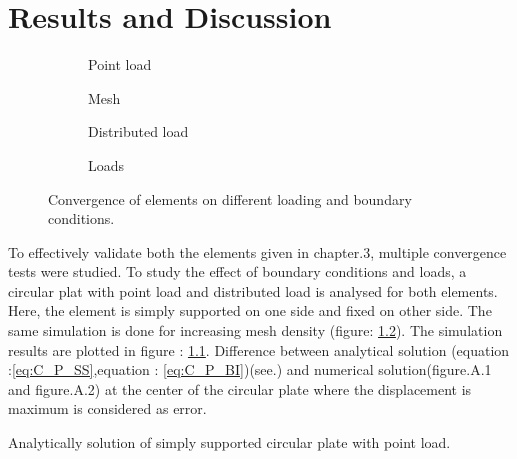 \documentclass[main.tex]{subfiles}
\begin{document}
\chapter{Results and Discussion}


\begin{figure}[h!]
\centering
\begin{subfigure}[t]{0.75\textwidth}



\caption{Point load}
\label{fig:C_P}
\end{subfigure} \hfill
\begin{subfigure}[t]{0.24\textwidth}



\caption{Mesh}
\label{fig:Mesh_Density}
\end{subfigure}
\vfill
\vspace{1cm}

\begin{subfigure}[t]{0.75\textwidth}
\centering


\caption{Distributed load}
\label{fig:C_q}
\end{subfigure} \hfill
\begin{subfigure}[t]{0.24\textwidth}
\centering


\caption{Loads}
\label{fig:Load_P_q}
\end{subfigure}
\vspace{1cm}
\caption{Convergence of elements on different loading and boundary conditions.}
\end{figure} \par

To effectively validate both the elements given in chapter.3, multiple convergence tests were studied. To study the effect of boundary conditions and loads, a circular plat with point load and distributed load is analysed for both elements. Here,  the element is simply supported on one side and fixed on other side. The same simulation is done for increasing mesh density (figure:  \ref{fig:Mesh_Density}). The simulation results are plotted in figure : \ref{fig:C_P}. Difference between analytical solution (equation :\ref{eq:C_P_SS},equation : \ref{eq:C_P_BI})(see.\cite{TIMOPLATES}) and numerical solution(figure.A.1 and figure.A.2) at the center of the circular plate where the displacement is maximum is considered as error. \par
Analytically solution of simply supported circular plate with point load.
\end{document}
